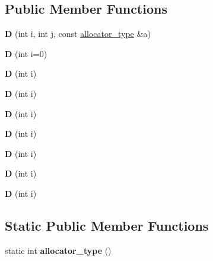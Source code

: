 \subsection*{Public Member Functions}
\begin{DoxyCompactItemize}
\item 
\mbox{\label{struct_d_aceae49f698aac46a9ba5e71bda9601a9}} 
{\bfseries D} (int i, int j, const \mbox{\hyperlink{struct_a1}{allocator\+\_\+type}} \&a)
\item 
\mbox{\label{struct_d_a352a14cc2ea964599dbf3719360cface}} 
{\bfseries D} (int i=0)
\item 
\mbox{\label{struct_d_a597faeb8e73da3323a8d4206e747be20}} 
{\bfseries D} (int i)
\item 
\mbox{\label{struct_d_a597faeb8e73da3323a8d4206e747be20}} 
{\bfseries D} (int i)
\item 
\mbox{\label{struct_d_a597faeb8e73da3323a8d4206e747be20}} 
{\bfseries D} (int i)
\item 
\mbox{\label{struct_d_a597faeb8e73da3323a8d4206e747be20}} 
{\bfseries D} (int i)
\item 
\mbox{\label{struct_d_a597faeb8e73da3323a8d4206e747be20}} 
{\bfseries D} (int i)
\item 
\mbox{\label{struct_d_a597faeb8e73da3323a8d4206e747be20}} 
{\bfseries D} (int i)
\item 
\mbox{\label{struct_d_a597faeb8e73da3323a8d4206e747be20}} 
{\bfseries D} (int i)
\end{DoxyCompactItemize}
\subsection*{Static Public Member Functions}
\begin{DoxyCompactItemize}
\item 
\mbox{\label{struct_d_acf7b095afdf9e2aece41eb12e52852d9}} 
static int {\bfseries allocator\+\_\+type} ()
\end{DoxyCompactItemize}

